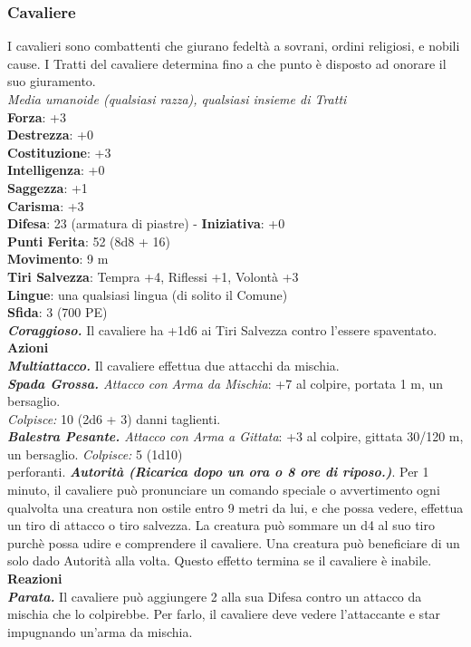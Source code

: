 \begin{multicols}{2}
\subsubsection*{Cavaliere}
I cavalieri sono combattenti che giurano fedeltà a sovrani, ordini religiosi, e nobili cause. I Tratti del cavaliere determina fino a che punto è disposto ad onorare il suo giuramento. \\
\emph{Media umanoide (qualsiasi razza), qualsiasi insieme di Tratti}\\
\textbf{Forza}: +3\\
\textbf{Destrezza}: +0\\
\textbf{Costituzione}: +3\\
\textbf{Intelligenza}: +0\\
\textbf{Saggezza}: +1\\
\textbf{Carisma}: +3\\
\textbf{Difesa}: 23 (armatura di piastre) - \textbf{Iniziativa}: +0\\
\textbf{Punti Ferita}: 52 (8d8 + 16)\\
\textbf{Movimento}: 9 m\\
\textbf{Tiri Salvezza}: Tempra +4, Riflessi +1, Volontà +3 \\
\textbf{Lingue}: una qualsiasi lingua (di solito il Comune)\\
\textbf{Sfida}: 3 (700 PE)\smallskip\\
\emph{\textbf{Coraggioso.}} Il cavaliere ha +1d6 ai Tiri Salvezza contro l'essere spaventato.\\
\smallskip\textbf{Azioni}\\
\emph{\textbf{Multiattacco.}} Il cavaliere effettua due attacchi da mischia.\\
\emph{\textbf{Spada Grossa.} Attacco con Arma da Mischia}: +7 al colpire, portata 1 m, un bersaglio.\\
\emph{Colpisce:} 10 (2d6 + 3) danni taglienti.\\
\emph{\textbf{Balestra Pesante.} Attacco con Arma a Gittata}: +3 al colpire, gittata 30/120 m, un bersaglio. \emph{Colpisce:} 5 (1d10)\\
perforanti.
\emph{\textbf{Autorità (Ricarica dopo un ora o 8 ore di riposo.)}}. Per 1 minuto, il cavaliere può pronunciare un comando speciale o avvertimento ogni qualvolta una creatura non ostile entro 9 metri da lui, e che possa vedere, effettua un tiro di attacco o tiro salvezza. La creatura può sommare un d4 al suo tiro purchè possa udire e comprendere il cavaliere. Una creatura può beneficiare di un solo dado Autorità alla volta. Questo effetto termina se il cavaliere è inabile. \\
\textbf{Reazioni}\\
\emph{\textbf{Parata.}} Il cavaliere può aggiungere 2 alla sua Difesa contro un attacco da mischia che lo colpirebbe. Per farlo, il cavaliere deve vedere l'attaccante e star impugnando un'arma da mischia.\\


\end{multicols}
